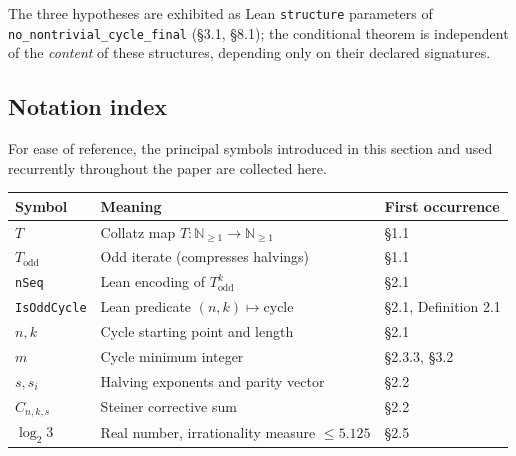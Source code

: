 \documentclass[
  11pt]{amsart}
\newcounter{none} %
\theoremstyle{plain}
\theoremstyle{definition}
\theoremstyle{remark}
\begin{document}
The three hypotheses are exhibited as Lean \texttt{structure} parameters
of \texttt{no\_nontrivial\_cycle\_final} (§3.1, §8.1); the conditional
theorem is independent of the \emph{content} of these structures,
depending only on their declared signatures.

\subsection{Notation index}\label{notation-index}

For ease of reference, the principal symbols introduced in this section
and used recurrently throughout the paper are collected here.

{\def\LTcaptype{none} %
\begin{longtable}[]{@{}
  >{\raggedright\arraybackslash}p{}
  >{\raggedright\arraybackslash}p{}
  >{\raggedright\arraybackslash}p{}@{}}
\toprule\noalign{}
\begin{minipage}[b]{\linewidth}\raggedright
Symbol
\end{minipage} & \begin{minipage}[b]{\linewidth}\raggedright
Meaning
\end{minipage} & \begin{minipage}[b]{\linewidth}\raggedright
First occurrence
\end{minipage} \\
\midrule\noalign{}
\endhead
\bottomrule\noalign{}
\endlastfoot
\(T\) & Collatz map \(T: \mathbb{N}_{\geq 1} \to \mathbb{N}_{\geq 1}\) &
§1.1 \\
\(T_{\mathrm{odd}}\) & Odd iterate (compresses halvings) & §1.1 \\
\texttt{nSeq} & Lean encoding of \(T_{\mathrm{odd}}^k\) & §2.1 \\
\texttt{IsOddCycle} & Lean predicate \((n, k) \mapsto \text{cycle}\) &
§2.1, Definition 2.1 \\
\(n, k\) & Cycle starting point and length & §2.1 \\
\(m\) & Cycle minimum integer & §2.3.3, §3.2 \\
\(s, s_i\) & Halving exponents and parity vector & §2.2 \\
\(C_{n, k, s}\) & Steiner corrective sum & §2.2 \\
\(\log_2 3\) & Real number, irrationality measure \(\leq 5.125\) &
§2.5 \\

\end{longtable}}
\end{document}
